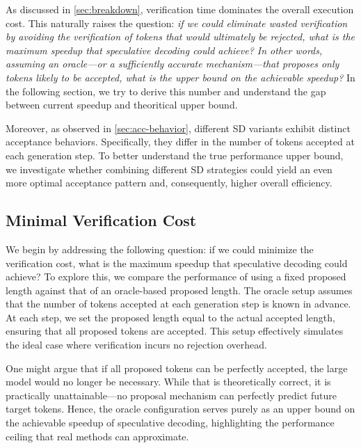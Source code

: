 \documentclass{article}
\begin{document}
As discussed in \autoref{sec:breakdown}, verification time dominates the overall execution cost. This naturally raises the question: \emph{if we could eliminate wasted verification by avoiding the verification of tokens that would ultimately be rejected, what is the maximum speedup that speculative decoding could achieve?
In other words, assuming an oracle—or a sufficiently accurate mechanism—that proposes only tokens likely to be accepted, what is the upper bound on the achievable speedup?} In the following section, we try to derive this number and understand the gap between current speedup and theoritical upper bound.

Moreover, as observed in \autoref{sec:acc-behavior}, different SD variants exhibit distinct acceptance behaviors. Specifically, they differ in the number of tokens accepted at each generation step. To better understand the true performance upper bound, we investigate whether combining different SD strategies could yield an even more optimal acceptance pattern and, consequently, higher overall efficiency. 




\subsection{Minimal Verification Cost}
We begin by addressing the following question: if we could minimize the verification cost, what is the maximum speedup that speculative decoding could achieve? To explore this, we compare the performance of using a fixed proposed length against that of an oracle-based proposed length. The oracle setup assumes that the number of tokens accepted at each generation step is known in advance. At each step, we set the proposed length equal to the actual accepted length, ensuring that all proposed tokens are accepted. This setup effectively simulates the ideal case where verification incurs no rejection overhead.

One might argue that if all proposed tokens can be perfectly accepted, the large model would no longer be necessary. While that is theoretically correct, it is practically unattainable—no proposal mechanism can perfectly predict future target tokens. Hence, the oracle configuration serves purely as an upper bound on the achievable speedup of speculative decoding, highlighting the performance ceiling that real methods can approximate.
\end{document}
